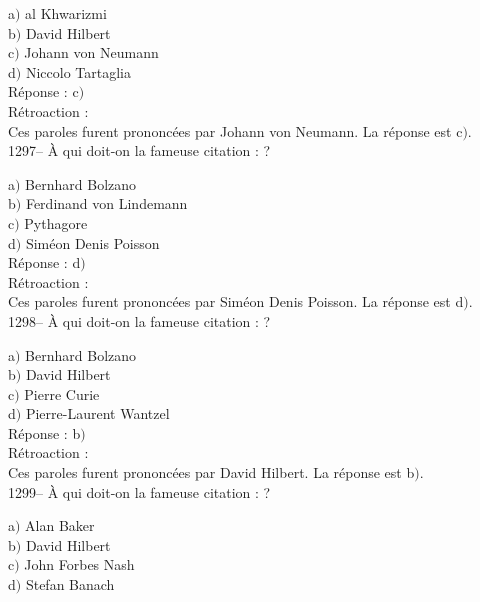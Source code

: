 ﻿\documentclass[letterpaper, 12pt]{article}
\begin{document}
a$)$ al Khwarizmi \\
b$)$ David Hilbert \\
c$)$ Johann von Neumann \\
d$)$ Niccolo Tartaglia\\

R\'eponse : c$)$\\

R\'etroaction : \\
Ces paroles furent prononc\'ees par Johann von Neumann.
La r\'eponse est  c$)$.\\

1297-- \`A qui doit-on la fameuse citation : \fg ?

a$)$ Bernhard Bolzano \\
b$)$ Ferdinand von Lindemann \\
c$)$ Pythagore \\
d$)$ Sim\'eon Denis Poisson\\

R\'eponse : d$)$\\

R\'etroaction : \\
Ces paroles furent prononc\'ees par Sim\'eon Denis Poisson.
La r\'eponse est  d$)$.\\

1298-- \`A qui doit-on la fameuse citation : \fg ?

a$)$ Bernhard Bolzano \\
b$)$ David Hilbert \\
c$)$ Pierre Curie \\
d$)$ Pierre-Laurent Wantzel\\

R\'eponse : b$)$\\

R\'etroaction : \\
Ces paroles furent prononc\'ees par David Hilbert.
La r\'eponse est  b$)$.\\

1299-- \`A qui doit-on la fameuse citation : \fg?

a$)$ Alan Baker \\
b$)$ David Hilbert \\
c$)$ John Forbes Nash \\
d$)$ Stefan Banach\\
\end{document}
